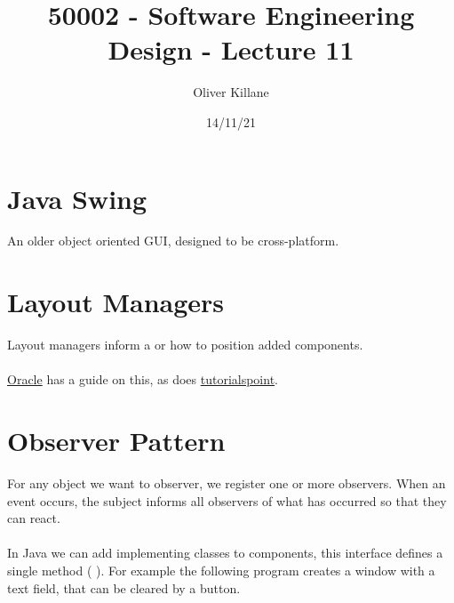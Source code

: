 \documentclass{report}
\title{50002 - Software Engineering Design - Lecture 11}
\author{Oliver Killane}
\date{14/11/21}
\begin{document}
\maketitle
{}

\section*{Java Swing}
An older object oriented GUI, designed to be cross-platform.


\section*{Layout Managers}
Layout managers inform a  or  how to position added components.
\\
\\ \href{https://docs.oracle.com/javase/tutorial/uiswing/layout/visual.html}{Oracle} has a guide on this, as does \href{https://www.tutorialspoint.com/swing/swing_layouts.htm}{tutorialspoint}.

\section*{Observer Pattern}
For any object we want to observer, we register one or more observers. When an event occurs, the subject informs all observers of what has occurred so that they can react.
\\
\\ In Java we can add  implementing classes to components, this interface defines a single method ( ).
For example the following program creates a window with a text field, that can be cleared by a button.
\end{document}
